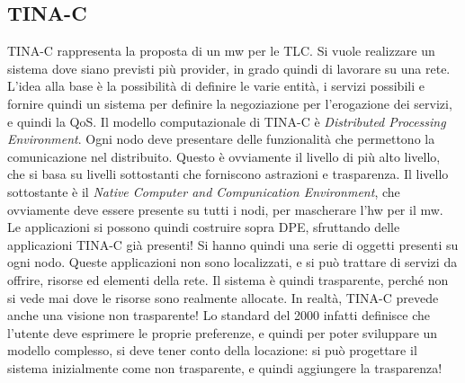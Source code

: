 \subsection{TINA-C}
TINA-C rappresenta la proposta di un mw per le TLC. Si vuole realizzare un sistema dove siano previsti più provider, 
in grado quindi di lavorare su una rete. L'idea alla base è la possibilità di definire le varie entità, i servizi
possibili e fornire quindi un sistema per definire la negoziazione per l'erogazione dei servizi, e quindi la QoS.
Il modello computazionale di TINA-C è \textit{Distributed Processing Environment}.
Ogni nodo deve presentare delle funzionalità che permettono la comunicazione nel distribuito. Questo è ovviamente il
livello di più alto livello, che si basa su livelli sottostanti che forniscono astrazioni e trasparenza. Il livello
sottostante è il \textit{Native Computer and Compunication Environment}, che ovviamente deve essere presente su tutti
i nodi, per mascherare l'hw per il mw.
Le applicazioni si possono quindi costruire sopra DPE, sfruttando delle applicazioni TINA-C già presenti! Si hanno
quindi una serie di oggetti presenti su ogni nodo. Queste applicazioni non sono localizzati, e si può trattare di
servizi da offrire, risorse ed elementi della rete. Il sistema è quindi trasparente, perché non si vede mai dove le
risorse sono realmente allocate.
In realtà, TINA-C prevede anche una visione non trasparente! Lo standard del 2000 infatti definisce che l'utente deve
esprimere le proprie preferenze, e quindi per poter sviluppare un modello complesso, si deve tener conto della
locazione: si può progettare il sistema inizialmente come non trasparente, e quindi aggiungere la trasparenza!
